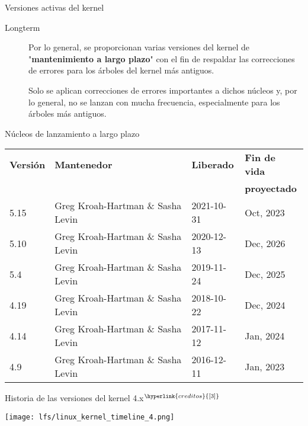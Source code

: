 \begin{frame}[c]{Versiones activas del kernel}
  \begin{description}
    \item[Longterm] Por lo general, se proporcionan varias versiones del
      kernel de "\textbf{mantenimiento a largo plazo}" con el fin de
      respaldar las correcciones de errores para los árboles del kernel
      más antiguos.

      \vspace{\baselineskip}
      Solo se aplican correcciones de errores importantes a dichos núcleos
      y, por lo general, no se lanzan con mucha frecuencia,
      especialmente para los árboles más antiguos.
  \end{description}
\end{frame}

\begin{frame}[c]{Núcleos de lanzamiento a largo plazo}
  \begin{table}[]
  \begin{tabular}{llll}
    \textbf{Versión} &  \textbf{Mantenedor} & \textbf{Liberado} & \textbf{Fin de vida} \\
     & & & \textbf{proyectado} \\
    \rowcolor{editorGray}
    5.15&Greg Kroah-Hartman \& Sasha Levin 	&2021-10-31 	&Oct, 2023 \\
    5.10&Greg Kroah-Hartman \& Sasha Levin 	&2020-12-13 	&Dec, 2026 \\
    \rowcolor{editorGray}
    5.4&Greg Kroah-Hartman \& Sasha Levin 	&2019-11-24 	&Dec, 2025 \\
    4.19&Greg Kroah-Hartman \& Sasha Levin 	&2018-10-22 	&Dec, 2024 \\
    \rowcolor{editorGray}
    4.14&Greg Kroah-Hartman \& Sasha Levin 	&2017-11-12 	&Jan, 2024 \\
    4.9&Greg Kroah-Hartman \& Sasha Levin 	&2016-12-11 	&Jan, 2023 \\
  \end{tabular}
  \end{table}
\end{frame}



\begin{frame}[c]{Historia de las versiones del kernel 4.x$^{\hyperlink{creditos}{[3]}}$}
  \begin{center}
    \texttt{[image: lfs/linux\_kernel\_timeline\_4.png]}
  \end{center}
\end{frame}

